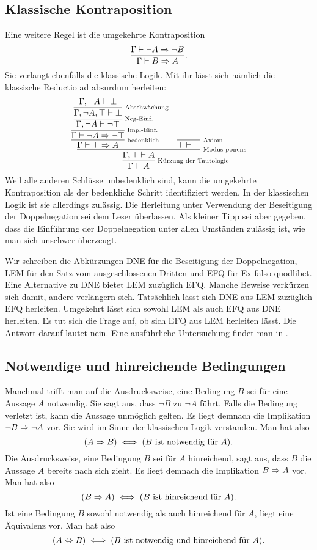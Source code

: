 \subsection{Klassische Kontraposition}

Eine weitere Regel ist die umgekehrte Kontraposition
\[\dfrac{\Gamma\vdash\lnot A\Rightarrow\lnot B}{\Gamma\vdash B\Rightarrow A}.\]
Sie verlangt ebenfalls die klassische Logik. Mit ihr lässt sich
nämlich die klassische Reductio ad absurdum herleiten:
\[
\infer[\infernote{Kürzung der Tautologie}]{\Gamma\vdash A}{
  \infer[\infernote{Modus ponens}]{\Gamma,\top\vdash A}{
    \infer[\infernote{bedenklich}]{\Gamma\vdash\top\cond A}{
      \infer[\infernote{Impl-Einf.}]{\Gamma\vdash\lnot A\cond\lnot\top}{
        \infer[\infernote{Neg-Einf.}]{\Gamma,\lnot A\vdash\lnot\top}{
          \infer[\infernote{Abschwächung}]{\Gamma,\lnot A,\top\vdash\bot}{
            \Gamma,\lnot A\vdash\bot}}}}
  & \infer[\infernote{Axiom}]{\top\vdash\top}{}}}
\]
Weil alle anderen Schlüsse unbedenklich sind, kann die umgekehrte
Kontraposition als der bedenkliche Schritt identifiziert werden.
In der klassischen Logik ist sie allerdings zulässig. Die Herleitung
unter Verwendung der Beseitigung der Doppelnegation sei dem Leser
überlassen. Als kleiner Tipp sei aber gegeben, dass die Einführung
der Doppelnegation unter allen Umständen zulässig ist, wie man sich
unschwer überzeugt.

Wir schreiben die Abkürzungen DNE für die Beseitigung der
Doppelnegation, LEM für den Satz vom ausgeschlossenen Dritten
und EFQ für Ex falso quodlibet. Eine Alternative zu DNE bietet
LEM zuzüglich EFQ. Manche Beweise verkürzen sich damit, andere
verlängern sich. Tatsächlich lässt sich DNE aus LEM zuzüglich EFQ
herleiten. Umgekehrt lässt sich sowohl LEM als auch EFQ aus DNE
herleiten. Es tut sich die Frage auf, ob sich EFQ aus LEM herleiten
lässt. Die Antwort darauf lautet nein. Eine ausführliche Untersuchung
findet man in \cite{Diener}.

\subsection{Notwendige und hinreichende Bedingungen}

Manchmal trifft man auf die Ausdrucksweise, eine Bedingung $B$ sei für
eine Aussage $A$ notwendig. Sie sagt aus, dass $\lnot B$ zu $\lnot A$
führt. Falls die Bedingung verletzt ist, kann die Aussage unmöglich
gelten. Es liegt demnach die Implikation $\lnot B\Rightarrow\lnot A$ vor.
Sie wird im Sinne der klassischen Logik verstanden. Man hat also
\[(A\Rightarrow B) \iff (\text{$B$ ist notwendig für $A$}).\]
Die Ausdrucksweise, eine Bedingung $B$ sei für $A$ hinreichend,
sagt aus, dass $B$ die Aussage $A$ bereits nach sich zieht. Es liegt
demnach die Implikation $B\Rightarrow A$ vor. Man hat also
\[(B\Rightarrow A) \iff (\text{$B$ ist hinreichend für $A$}).\]
Ist eine Bedingung $B$ sowohl notwendig als auch hinreichend für $A$,
liegt eine Äquivalenz vor. Man hat also
\[(A\Leftrightarrow B) \iff (\text{$B$ ist notwendig und hinreichend für $A$}).\]

